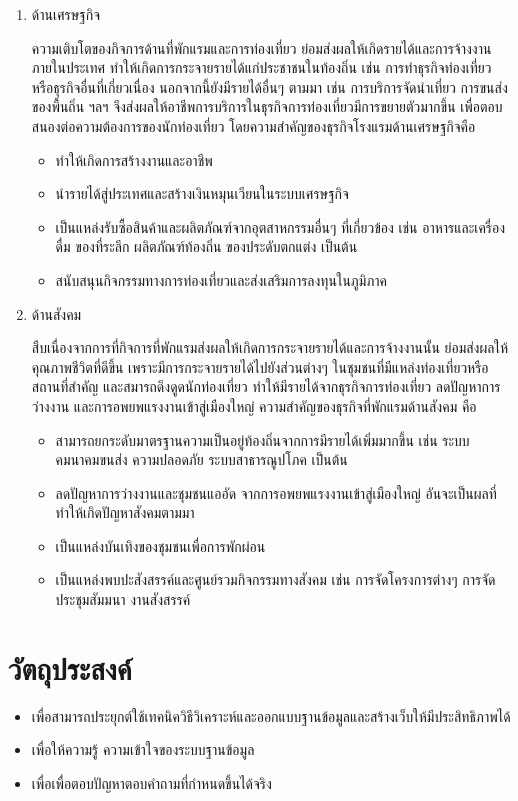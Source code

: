 \documentclass{report}
\begin{document}
\begin{enumerate}
    \item{ด้านเศรษฐกิจ} \par
    ความเติบโตของกิจการด้านที่พักแรมและการท่องเที่ยว ย่อมส่งผลให้เกิดรายได้และการจ้างงานภายในประเทศ ทำให้เกิดการกระจายรายได้แก่ประชาชนในท้องถิ่น เช่น การทำธุรกิจท่องเที่ยวหรือธุรกิจอื่นที่เกี่ยวเนื่อง นอกจากนี้ยังมีรายได้อื่นๆ ตามมา เช่น การบริการจัดนำเที่ยว การขนส่ง ของพื้นถิ่น ฯลฯ จึงส่งผลให้อาชีพการบริการในธุรกิจการท่องเที่ยวมีการขยายตัวมากขึ้น เพื่อตอบสนองต่อความต้องการของนักท่องเที่ยว โดยความสำคัญของธุรกิจโรงแรมด้านเศรษฐกิจคือ
        \begin{itemize}
            \item ทำให้เกิดการสร้างงานและอาชีพ
            \item นำรายได้สู่ประเทศและสร้างเงินหมุนเวียนในระบบเศรษฐกิจ
            \item เป็นแหล่งรับซื้อสินค้าและผลิตภัณฑ์จากอุตสาหกรรมอื่นๆ ที่เกี่ยวข้อง เช่น อาหารและเครื่องดื่ม ของที่ระลึก ผลิตภัณฑ์ท้องถิ่น ของประดับตกแต่ง เป็นต้น
            \item สนับสนุนกิจกรรมทางการท่องเที่ยวและส่งเสริมการลงทุนในภูมิภาค
        \end{itemize}
    \item{ด้านสังคม} \par
    สืบเนื่องจากการที่กิจการที่พักแรมส่งผลให้เกิดการกระจายรายได้และการจ้างงานนั้น ย่อมส่งผลให้คุณภาพชีวิตที่ดีขึ้น เพราะมีการกระจายรายได้ไปยังส่วนต่างๆ ในชุมชนที่มีแหล่งท่องเที่ยวหรือสถานที่สำคัญ และสมารถดึงดูดนักท่องเที่ยว ทำให้มีรายได้จากธุรกิจการท่องเที่ยว ลดปัญหาการว่างงาน และการอพยพแรงงานเข้าสู่เมืองใหญ่ ความสำคัญของธุรกิจที่พักแรมด้านสังคม คือ
        \begin{itemize}
            \item สามารถยกระดับมาตรฐานความเป็นอยู่ท้องถิ่นจากการมีรายได้เพิ่มมากขึ้น เช่น ระบบคมนาคมขนส่ง ความปลอดภัย ระบบสาธารณูปโภค เป็นต้น
            \item ลดปัญหาการว่างงานและชุมชนแออัด จากการอพยพแรงงานเข้าสู่เมืองใหญ่ อันจะเป็นผลที่ทำให้เกิดปัญหาสังคมตามมา
            \item เป็นแหล่งบันเทิงของชุมชนเพื่อการพักผ่อน
            \item เป็นแหล่งพบปะสังสรรค์และศูนย์รวมกิจกรรมทางสังคม เช่น การจัดโครงการต่างๆ การจัดประชุมสัมมนา งานสังสรรค์ \cite{his}
        \end{itemize}
\end{enumerate} 

\pagebreak

\section{วัตถุประสงค์}
\begin{itemize}
    \item{เพื่อสามารถประยุกต์ใช้เทคนิควิธีวิเคราะห์และออกแบบฐานข้อมูลและสร้างเว็บให้มีประสิทธิภาพได้}
    \item{เพื่อให้ความรู้ ความเข้าใจของระบบฐานข้อมูล}
    \item{เพื่อเพื่อตอบปัญหาตอบคำถามที่กำหนดขึ้นได้จริง}
\end{itemize}
\end{document}
